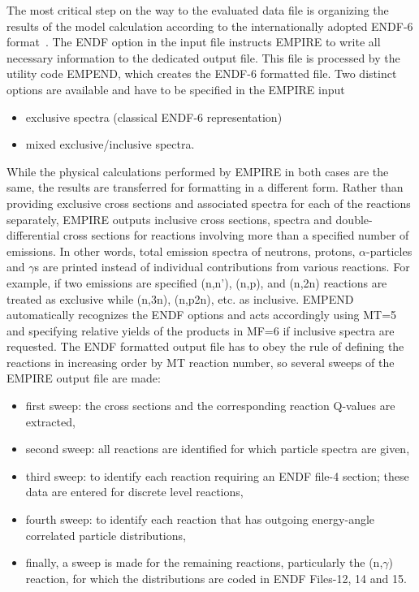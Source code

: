 \documentclass[twocolumn,amsmath,amssymb,10pt,groupedaddress,a4paper]{revtex4}
\begin{document}
The most critical step on the way to the evaluated data file is organizing the results of the model calculation according to the internationally adopted ENDF-6 format~\cite{ENDF-102}.
The ENDF option in the input file instructs EMPIRE to
write all necessary information to the dedicated output file.
This file is processed by the utility
code EMPEND, which creates the ENDF-6 formatted file.
Two distinct options are available and have to be specified in the EMPIRE input
\begin{itemize}
\item exclusive spectra (classical ENDF-6 representation)
\item mixed exclusive/inclusive spectra.
\end{itemize}
While the physical calculations performed by EMPIRE in both
cases are the same, the results are transferred for formatting in
a different form. Rather than providing exclusive cross sections and
associated spectra for each of the reactions separately, EMPIRE outputs
inclusive cross sections, spectra and double-differential cross sections for
reactions involving more than a specified number of emissions.
In other words, total emission spectra of neutrons, protons, $\alpha$-particles
and $\gamma$s are printed instead of individual contributions from
various reactions. For example, if two
emissions are specified (n,n'), (n,p), and (n,2n) reactions are treated as exclusive while
(n,3n), (n,p2n), etc. as inclusive.
EMPEND automatically recognizes
the ENDF options and acts accordingly using MT=5 and specifying relative
yields of the products in MF=6 if inclusive spectra are requested.
The ENDF formatted
output file has to obey the rule of defining the reactions in increasing
order by MT reaction number, so several sweeps of the EMPIRE output file
are made:
\begin{itemize}
\item first sweep: the cross sections and the corresponding reaction Q-values
are extracted,
\item second sweep: all reactions are identified for which particle spectra
are given,
\item third sweep: to identify each reaction requiring an ENDF file-4 section;
these data are entered for discrete level reactions,
\item fourth sweep: to identify each reaction that has outgoing energy-angle
correlated particle distributions,
\item finally, a sweep is made for the remaining reactions, particularly
the (n,$\gamma$) reaction, for which the distributions are coded
in ENDF Files-12, 14 and 15.
\end{itemize}
\end{document}
